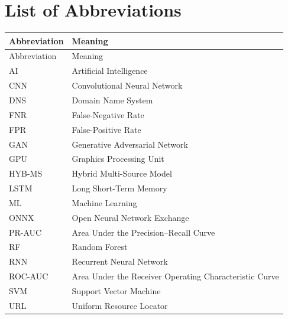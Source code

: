 \chapter*{List of Abbreviations}

\begin{longtable}{@{}p{}p{}@{}}
\toprule
Abbreviation & Meaning \\
\midrule
\endfirsthead
\toprule Abbreviation & Meaning \\
\midrule
\endhead
AI & Artificial Intelligence \\
CNN & Convolutional Neural Network \\
DNS & Domain Name System \\
FNR & False-Negative Rate \\
FPR & False-Positive Rate \\
GAN & Generative Adversarial Network \\
GPU & Graphics Processing Unit \\
HYB-MS & Hybrid Multi-Source Model \\
LSTM & Long Short-Term Memory \\
ML & Machine Learning \\
ONNX & Open Neural Network Exchange \\
PR-AUC & Area Under the Precision--Recall Curve \\
RF & Random Forest \\
RNN & Recurrent Neural Network \\
ROC-AUC & Area Under the Receiver Operating Characteristic Curve \\
SVM & Support Vector Machine \\
URL & Uniform Resource Locator \\
\bottomrule
\end{longtable}

\clearpage
